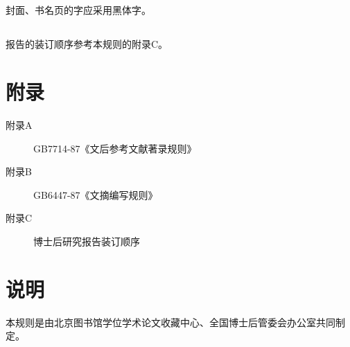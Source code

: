 \subsection{}

封面、书名页的字应采用黑体字。


\subsection{}

报告的装订顺序参考本规则的附录C。


\section*{附录}

\begin{description}

\item[附录A] GB7714-87《文后参考文献著录规则》

\item[附录B] GB6447-87《文摘编写规则》

\item[附录C]  博士后研究报告装订顺序


\end{description}


\section*{说明}

本规则是由北京图书馆学位学术论文收藏中心、全国博士后管委会办公室共同制定。
